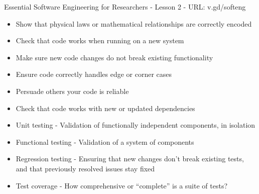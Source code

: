 \documentclass[8pt]{extarticle}
\begin{document}
\thispagestyle{empty}

\begin{center}
  {\LARGE
  Essential Software Engineering for Researchers - Lesson 2 - URL: v.gd/softeng}
\end{center}

\begin{navybox}[title=Why test?]
  \begin{multicols}{2}
    \begin{itemize}
    \itemsep-3pt
    \item Show that physical laws or mathematical relationships are correctly encoded
    \item Check that code works when running on a new system
    \item Make sure new code changes do not break existing functionality
    \item Ensure code correctly handles edge or corner cases
    \item Persuade others your code is reliable
    \item Check that code works with new or updated dependencies
    \end{itemize}
  \end{multicols}
\end{navybox}


\begin{bluebox}[title=Useful terms]
  \begin{itemize}
    \itemsep-3pt
  \item Unit testing - Validation of functionally independent components, in
    isolation
  \item Functional testing - Validation of a system of components
  \item Regression testing - Ensuring that new changes don't break existing
    tests, and that previously resolved issues stay fixed
  \item Test coverage - How comprehensive or ``complete'' is a suite of tests?
  \end{itemize}
\end{bluebox}
\end{document}

